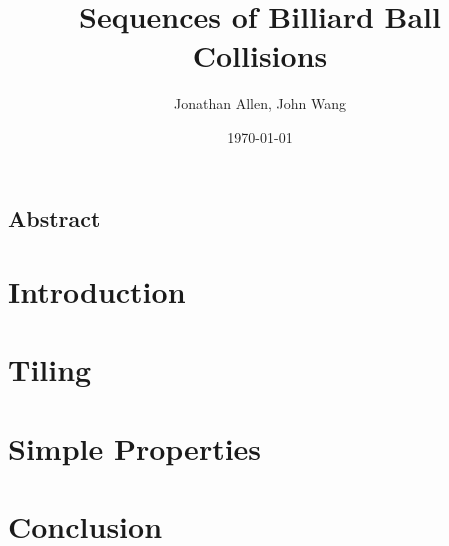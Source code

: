 \documentclass[12pt]{amsart}   %
\begin{document}
\graphicspath{ {figures/} }

\title[Billiards]{Sequences of Billiard Ball Collisions}

\author{Jonathan Allen, John Wang}
\date{\today}

\maketitle

\subsection*{Abstract}

\section{Introduction}


\section{Tiling}


\section{Simple Properties}


\section{Conclusion}


\begin{appendix}
\end{appendix}


\end{document}
